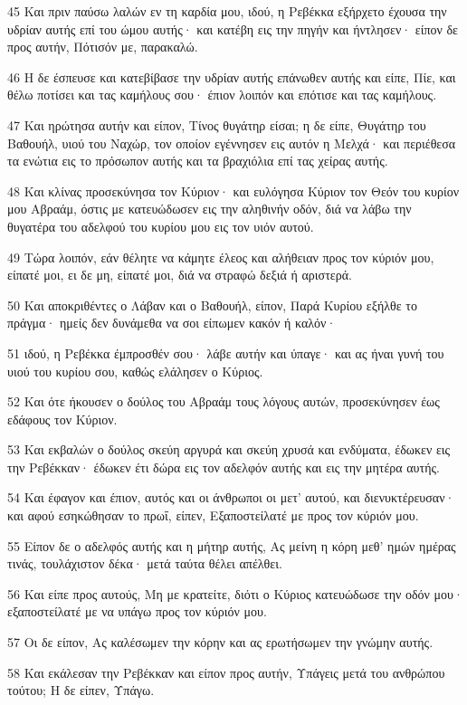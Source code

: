 \par 45 Και πριν παύσω λαλών εν τη καρδία μου, ιδού, η Ρεβέκκα εξήρχετο έχουσα την υδρίαν αυτής επί του ώμου αυτής· και κατέβη εις την πηγήν και ήντλησεν· είπον δε προς αυτήν, Πότισόν με, παρακαλώ.
\par 46 Η δε έσπευσε και κατεβίβασε την υδρίαν αυτής επάνωθεν αυτής και είπε, Πίε, και θέλω ποτίσει και τας καμήλους σου· έπιον λοιπόν και επότισε και τας καμήλους.
\par 47 Και ηρώτησα αυτήν και είπον, Τίνος θυγάτηρ είσαι; η δε είπε, Θυγάτηρ του Βαθουήλ, υιού του Ναχώρ, τον οποίον εγέννησεν εις αυτόν η Μελχά· και περιέθεσα τα ενώτια εις το πρόσωπον αυτής και τα βραχιόλια επί τας χείρας αυτής.
\par 48 Και κλίνας προσεκύνησα τον Κύριον· και ευλόγησα Κύριον τον Θεόν του κυρίον μου Αβραάμ, όστις με κατευώδωσεν εις την αληθινήν οδόν, διά να λάβω την θυγατέρα του αδελφού του κυρίου μου εις τον υιόν αυτού.
\par 49 Τώρα λοιπόν, εάν θέλητε να κάμητε έλεος και αλήθειαν προς τον κύριόν μου, είπατέ μοι, ει δε μη, είπατέ μοι, διά να στραφώ δεξιά ή αριστερά.
\par 50 Και αποκριθέντες ο Λάβαν και ο Βαθουήλ, είπον, Παρά Κυρίου εξήλθε το πράγμα· ημείς δεν δυνάμεθα να σοι είπωμεν κακόν ή καλόν·
\par 51 ιδού, η Ρεβέκκα έμπροσθέν σου· λάβε αυτήν και ύπαγε· και ας ήναι γυνή του υιού του κυρίου σου, καθώς ελάλησεν ο Κύριος.
\par 52 Και ότε ήκουσεν ο δούλος του Αβραάμ τους λόγους αυτών, προσεκύνησεν έως εδάφους τον Κύριον.
\par 53 Και εκβαλών ο δούλος σκεύη αργυρά και σκεύη χρυσά και ενδύματα, έδωκεν εις την Ρεβέκκαν· έδωκεν έτι δώρα εις τον αδελφόν αυτής και εις την μητέρα αυτής.
\par 54 Και έφαγον και έπιον, αυτός και οι άνθρωποι οι μετ' αυτού, και διενυκτέρευσαν· και αφού εσηκώθησαν το πρωΐ, είπεν, Εξαποστείλατέ με προς τον κύριόν μου.
\par 55 Είπον δε ο αδελφός αυτής και η μήτηρ αυτής, Ας μείνη η κόρη μεθ' ημών ημέρας τινάς, τουλάχιστον δέκα· μετά ταύτα θέλει απέλθει.
\par 56 Και είπε προς αυτούς, Μη με κρατείτε, διότι ο Κύριος κατευώδωσε την οδόν μου· εξαποστείλατέ με να υπάγω προς τον κύριόν μου.
\par 57 Οι δε είπον, Ας καλέσωμεν την κόρην και ας ερωτήσωμεν την γνώμην αυτής.
\par 58 Και εκάλεσαν την Ρεβέκκαν και είπον προς αυτήν, Υπάγεις μετά του ανθρώπου τούτου; Η δε είπεν, Υπάγω.
